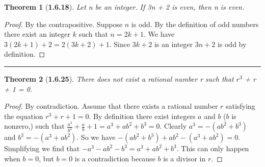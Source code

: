 \documentclass[a4paper, 12pt]{article}
\theoremstyle{plain}
\newtheorem*{theorem*}{Theorem}
\begin{document}
\pagebreak


\begin{theorem*}[\textbf{1.6.18}]
    Let n be an integer. If 3n + 2 is even, then n is even.
\end{theorem*}

\begin{proof}
    By the contrapositive. Suppose $n$ is odd. By the definition of odd numbers there exist an integer
    $k$ such that $n = 2k + 1$. We have \newline $3(2k + 1) + 2 = 2(3k + 2) + 1$. Since $3k + 2$ is an 
    integer $3n + 2$ is odd by definition.
\end{proof}
\begin{center}
    \rule{5.4in}{1pt}
\end{center}


\begin{theorem*}[\textbf{1.6.25}]
    There does not exist a rational number r such that \newline $r^{3}$ + r + 1 = 0.
\end{theorem*}

\begin{proof}
    By contradiction. Assume that there exists a rational number $r$ \newline satisfying the 
    equation $r^{3} + r + 1 = 0$. By definition there exist integers $a$ and $b$ 
    ($b$ is nonzero,) such that 
    $\frac{a^{3}}{b^{3}} + \frac{a}{b} + 1 = a^{3} + ab^{2} + b^{3} = 0$. 
    Clearly $a^{3} = -(ab^{2} + b^{3})$ and $b^{3} = -(a^{3} + ab^{2})$. So we have 
    $-(ab^{2} + b^{3}) + ab^{2} - (a^{3} + ab^{2}) = 0$. Simplifying we find that 
    $-a^{3} -ab^{2} - b^{3} = a^{3} + ab^{2} + b^{3}$. This can only happen when $b = 0$, but 
    $b = 0$ is a contradiction because $b$ is a divisor in $r$.
\end{proof}
\end{document}
